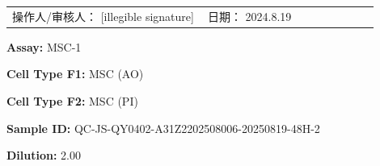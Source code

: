 \documentclass[UTF8,10pt,a4paper,fontset=fandol]{ctexart}
\newcommand{\fieldvalue}[1]{#1}
\newcommand{\handwritten}[1]{#1}
\begin{document}
\vspace{1.5em}

\noindent
\begin{minipage}[t]{0.47\linewidth}
\fbox{\rule{0pt}{0.25\textheight}\rule{0.95\linewidth}{0pt}}

\vspace{0.8em}

\fbox{\rule{0pt}{0.25\textheight}\rule{0.95\linewidth}{0pt}}
\end{minipage}
\hfill
\begin{minipage}[t]{0.47\linewidth}
\fbox{\rule{0pt}{0.25\textheight}\rule{0.95\linewidth}{0pt}}

\vspace{0.8em}

\fbox{\rule{0pt}{0.25\textheight}\rule{0.95\linewidth}{0pt}}
\end{minipage}

\vfill

\noindent
\begin{tabular}{@{}p{0.48\linewidth}p{0.42\linewidth}@{}}
操作人/审核人：
\fieldvalue{\handwritten{[illegible signature]}}
&
日期：
\fieldvalue{\handwritten{2024.8.19}}
\end{tabular}

\newpage

\noindent\textbf{Assay:} 
\fieldvalue{MSC-1}

\medskip
\noindent\textbf{Cell Type F1:} 
\fieldvalue{MSC (AO)}

\noindent\textbf{Cell Type F2:} 
\fieldvalue{MSC (PI)}

\medskip
\noindent\textbf{Sample ID:} 
\fieldvalue{QC-JS-QY0402-A31Z2202508006-20250819-48H-2}

\noindent\textbf{Dilution:} 
\fieldvalue{2.00}
\end{document}
